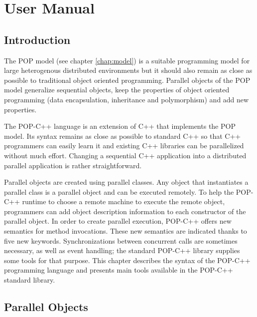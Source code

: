 \chapter{User Manual}

\section{Introduction}


The POP model (see chapter \ref{chap:model}) is a suitable programming model for
large heterogenous distributed environments but it should also remain
as close as possible to traditional object oriented programming. 
Parallel objects of the POP model generalize sequential objects, 
keep the properties of object oriented programming (data encapsulation,
inheritance and polymorphism) and add new properties.

The POP-C++ language is an extension of C++ that implements the POP model.
Its syntax remains as close as possible to standard
C++ so that C++ programmers can easily learn it and existing
C++ libraries can be parallelized without much effort.
Changing a sequential C++ application into a distributed parallel
application is rather straightforward.

Parallel objects are created using parallel classes. Any object that
instantiates a parallel class is a parallel object and can be executed
remotely. To help the POP-C++ runtime to choose a remote machine
to execute the remote object, programmers can add object description
information to each constructor of the parallel object. In order to
create parallel execution, POP-C++ offers new semantics for method
invocations. These new semantics are indicated thanks to five new
keywords. Synchronizations between concurrent calls are sometimes
necessary, as well as event handling; the standard POP-C++ library supplies
some tools for that purpose. This chapter describes the syntax of the
POP-C++ programming language and presents main tools available in the
POP-C++ standard library.



\section{Parallel Objects}



